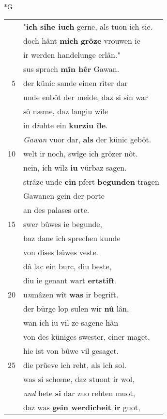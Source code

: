 \documentclass[8pt,a4paper,notitlepage]{article}
\begin{document}
\newpage
\begin{table}[ht]
\begin{minipage}[t]{0.5\linewidth}
\small
\begin{center}*G
\end{center}
\begin{tabular}{rl}
 & "\textbf{ich sihe iuch} gerne, als tuon ich sie.\\ 
 & doch hânt \textbf{mich} \textbf{grôze} vrouwen ie\\ 
 & ir werden handelunge erlân."\\ 
 & sus sprach \textbf{mîn hêr} Gawan.\\ 
5 & der künic sande einen rîter dar\\ 
 & unde enbôt der meide, daz si sîn war\\ 
 & sô næme, daz langiu wîle\\ 
 & in d\textit{i}uhte ein \textbf{kurziu île}.\\ 
 & \textit{Gawan} vuor dar, \textbf{als} der künic gebôt.\\ 
10 & welt ir noch, swîge ich grôzer nôt.\\ 
 & nein, ich wilz \textbf{iu} vürbaz sagen.\\ 
 & strâze unde \textbf{ein} pfert \textbf{begunden} tragen\\ 
 & Gawanen gein der porte\\ 
 & an des palases orte.\\ 
15 & swer bûwes ie begunde,\\ 
 & baz dane ich sprechen kunde\\ 
 & von dises bûwes veste.\\ 
 & dâ lac ein burc, diu beste,\\ 
 & diu ie genant wart \textbf{ertstift}.\\ 
20 & u\textit{n}mâzen wît \textbf{was} ir begrift.\\ 
 & der bürge lop sulen wir \textbf{nû} lân,\\ 
 & wan ich iu vil ze sagene hân\\ 
 & von des küniges swester, einer maget.\\ 
 & hie ist von bûwe vil gesaget.\\ 
25 & die prüeve ich reht, als ich sol.\\ 
 & was si schœne, daz stuont ir wol,\\ 
 & \textit{und} hete \textbf{si} dar zuo rehten muot,\\ 
 & daz was \textbf{gein werdicheit ir} guot,\\ 

\end{tabular}
\end{minipage}
\end{table}
\end{document}
